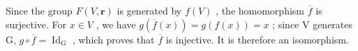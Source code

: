 Since the group \(F(V, \mathbf{r})\) is generated by \(f(V)\) , the homomorphism \(\overline{f}\) is surjective. For \(x \in V\) , we have \(g(\overline{f}(x)) = g(f(x)) = x\) ; since V generates G, \(g \circ \overline{f} = \operatorname{Id}_{\operatorname{G}}\) , which proves that \(\overline{f}\) is injective. It is therefore an isomorphism.
